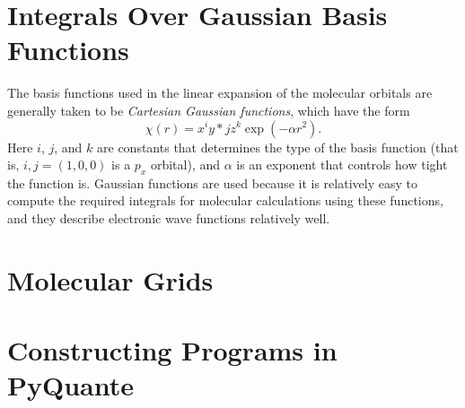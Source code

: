 \documentclass[twocolumn]{revtex4}
\begin{document}
\section{Integrals Over Gaussian Basis Functions}
The basis functions used in the linear expansion of the molecular
orbitals are generally taken to be \emph{Cartesian Gaussian
functions}, which have the form
\begin{equation}
\chi(r) = x^iy*jz^k\exp(-\alpha r^2).
\end{equation}
Here $i$, $j$, and $k$ are constants that determines the type of the
basis function (that is, $i,j = (1,0,0)$ is a $p_x$ orbital), and
$\alpha$ is an exponent that controls how tight the function
is. Gaussian functions are used because it is relatively easy to
compute the required integrals for molecular calculations using these
functions, and they describe electronic wave functions relatively well.

\section{Molecular Grids}

\section{Constructing Programs in PyQuante}
\end{document}
